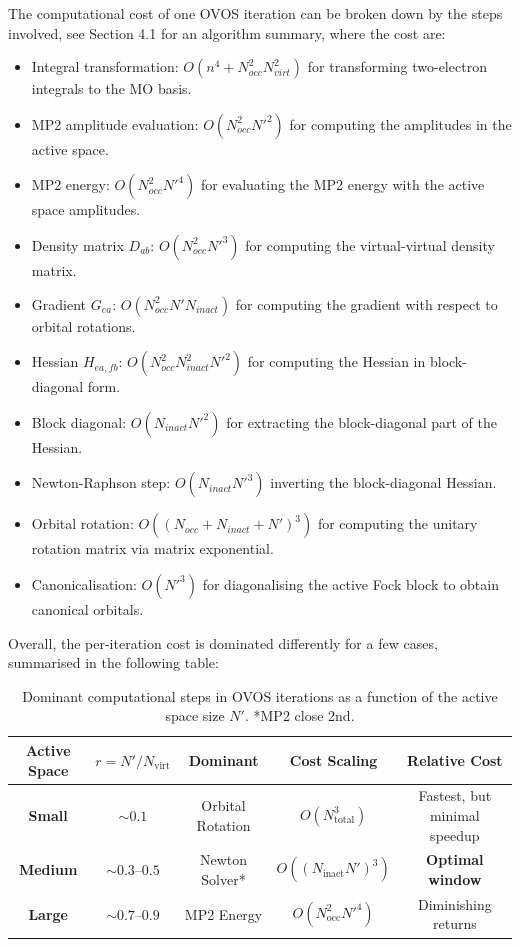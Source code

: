 The computational cost of one OVOS iteration can be broken down by the steps involved, see Section 4.1 for an algorithm summary, where the cost are:
\begin{itemize}
    \item Integral transformation: $O(n^4 + N_{occ}^2 N_{virt}^2)$ for transforming two-electron integrals to the MO basis.
    \item MP2 amplitude evaluation: $O(N_{occ}^2 N'^2)$ for computing the amplitudes in the active space.
    \item MP2 energy: $O(N_{occ}^2 N'^4)$ for evaluating the MP2 energy with the active space amplitudes.
    \item Density matrix $D_{ab}$: $O(N_{occ}^2 N'^3)$ for computing the virtual-virtual density matrix.
    \item Gradient $G_{ea}$: $O(N_{occ}^2 N' N_{inact})$ for computing the gradient with respect to orbital rotations.
    \item Hessian $H_{ea,fb}$: $O(N_{occ}^2 N_{inact}^2 N'^2)$ for computing the Hessian in block-diagonal form.
    \item Block diagonal: $O(N_{inact} N'^2)$ for extracting the block-diagonal part of the Hessian.
    \item Newton-Raphson step: $O(N_{inact} N'^3)$ inverting the block-diagonal Hessian.
    \item Orbital rotation: $O((N_{occ}+ N_{inact} + N')^3)$ for computing the unitary rotation matrix via matrix exponential.
    \item Canonicalisation: $O(N'^3)$ for diagonalising the active Fock block to obtain canonical orbitals.
\end{itemize}
Overall, the per-iteration cost is dominated differently for a few cases, summarised in the following table:
\begin{table}[h]
    \centering
    \small
    \begin{tabular}{c|c|c|c|c}
        \textbf{Active Space} & \textbf{$r = N'/N_{\text{virt}}$} & \textbf{Dominant} & \textbf{Cost Scaling} & \textbf{Relative Cost} \\
        \hline
        \textbf{Small} & $\sim 0.1$ & Orbital Rotation & $O(N_{\text{total}}^3)$ & Fastest, but minimal speedup \\
        \textbf{Medium} & $\sim 0.3$–$0.5$ & Newton Solver* & $O((N_{\text{inact}} N')^3)$ & \textbf{Optimal window} \\
        \textbf{Large} & $\sim 0.7$–$0.9$ & MP2 Energy & $O(N_{\text{occ}}^2 N'^4)$ & Diminishing returns \\
        \hline
    \end{tabular}
    \caption{Dominant computational steps in OVOS iterations as a function of the active space size $N'$. *MP2 close 2nd.}
\end{table}
